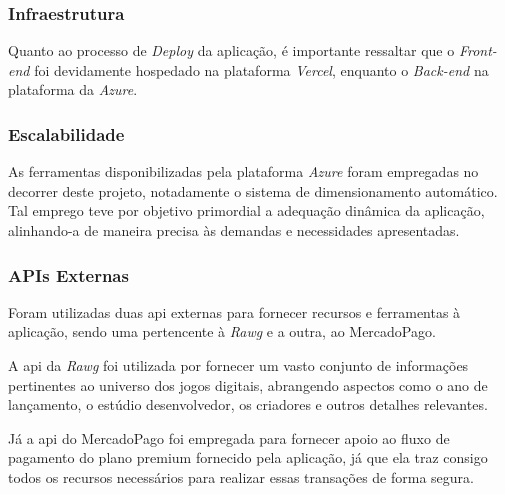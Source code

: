 \subsubsection{Infraestrutura}

Quanto ao processo de \textit{\gls{Deploy}} da aplicação, é importante ressaltar que o \textit{\gls{Front-end}} foi devidamente hospedado na plataforma \textit{\gls{Vercel}}, enquanto o \textit{\gls{Back-end}} na plataforma da \textit{\gls{Azure}}.

\subsubsection{Escalabilidade}

As ferramentas disponibilizadas pela plataforma \textit{\gls{Azure}} foram empregadas no decorrer deste projeto, notadamente o sistema de dimensionamento automático. Tal emprego teve por objetivo primordial a adequação dinâmica da aplicação, alinhando-a de maneira precisa às demandas e necessidades apresentadas.

\subsubsection{APIs Externas}
Foram utilizadas duas \ac{api} externas para fornecer recursos e ferramentas à aplicação, sendo uma pertencente à \textit{\gls{Rawg}} e a outra, ao \gls{MercadoPago}.

A \ac{api} da \textit{\gls{Rawg}} foi utilizada por fornecer um
vasto conjunto de informações pertinentes ao universo dos jogos digitais, abrangendo
aspectos como o ano de lançamento, o estúdio desenvolvedor, os criadores e outros detalhes
relevantes.

Já a \ac{api} do \gls{MercadoPago} foi empregada para fornecer apoio ao fluxo de pagamento do plano premium fornecido pela aplicação, já que ela traz consigo todos os recursos necessários para realizar essas transações de forma segura.